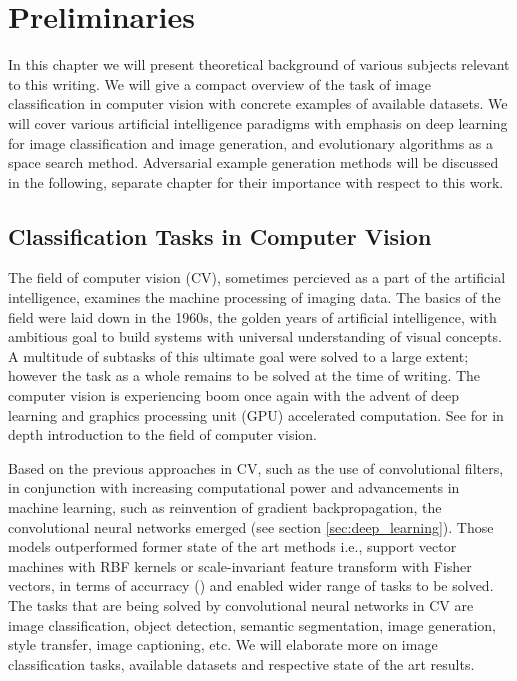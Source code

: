 \chapter{Preliminaries}
\label{sec:preliminaries}
In this chapter we will present theoretical background of various subjects relevant to this writing. We will give a compact overview of the task of image classification in computer vision with concrete examples of available datasets. We will cover various artificial intelligence paradigms with emphasis on deep learning for image classification and image generation, and evolutionary algorithms as a space search method. Adversarial example generation methods will be discussed in the following, separate chapter for their importance with respect to this work.

\section{Classification Tasks in Computer Vision}
\label{sec:cv}
The field of computer vision (CV), sometimes percieved as a part of the artificial intelligence, examines the machine processing of imaging data. The basics of the field were laid down in the 1960s, the golden years of artificial intelligence, with ambitious goal to build systems with universal understanding of visual concepts. A multitude of subtasks of this ultimate goal were solved to a large extent; however the task as a whole remains to be solved at the time of writing. The computer vision is experiencing boom once again with the advent of deep learning and graphics processing unit (GPU) accelerated computation. See \cite{computer_vision} for in depth introduction to the field of computer vision.

Based on the previous approaches in CV, such as the use of convolutional filters, in conjunction with increasing computational power and advancements in machine learning, such as reinvention of gradient backpropagation, the convolutional neural networks emerged (see section \ref{sec:deep_learning}). Those models outperformed former state of the art methods i.e., support vector machines with RBF kernels or scale-invariant feature transform with Fisher vectors, in terms of accurracy (\cite{NIPS2012_4824}) and enabled wider range of tasks to be solved. The tasks that are being solved by convolutional neural networks in CV are image classification, object detection, semantic segmentation, image generation, style transfer, image captioning, etc. We will elaborate more on image classification tasks, available datasets and respective state of the art results.

